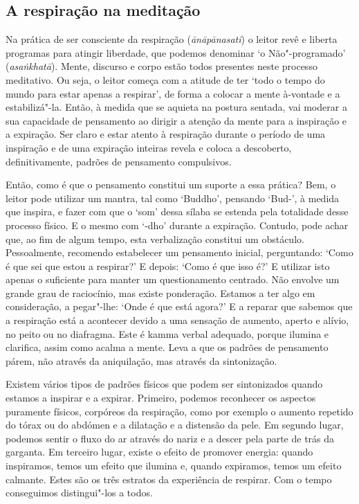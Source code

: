 \subsection{A respiração na meditação}

Na prática de ser consciente da respiração (\emph{ānāpānasati}) o leitor revê e
liberta programas para atingir liberdade, que podemos denominar `o
Não"-programado' (\emph{asaṅkhatā}). Mente, discurso e corpo estão todos
presentes neste processo meditativo. Ou seja, o leitor começa com a atitude de
ter `todo o tempo do mundo para estar apenas a respirar', de forma a colocar a
mente à-vontade e a estabilizá"-la. Então, à medida que se aquieta na postura
sentada, vai moderar a sua capacidade de pensamento ao dirigir a atenção da
mente para a inspiração e a expiração. Ser claro e estar atento à respiração
durante o período de uma inspiração e de uma expiração inteiras revela e coloca
a descoberto, definitivamente, padrões de pensamento compulsivos.

Então, como é que o pensamento constitui um suporte a essa prática? Bem, o
leitor pode utilizar um mantra, tal como `Buddho', pensando `Bud-', à medida que
inspira, e fazer com que o `som' dessa sílaba se estenda pela totalidade desse
processo físico. E o mesmo com `-dho' durante a expiração. Contudo, pode achar
que, ao fim de algum tempo, esta verbalização constitui um obstáculo.
Pessoalmente, recomendo estabelecer um pensamento inicial, perguntando: `Como é
que sei que estou a respirar?' E depois: `Como é que isso é?' E utilizar isto
apenas o suficiente para manter um questionamento centrado. Não envolve um
grande grau de raciocínio, mas existe ponderação. Estamos a ter algo em
consideração, a pegar"-lhe: `Onde é que está agora?' E a reparar que sabemos que
a respiração está a acontecer devido a uma sensação de aumento, aperto e alívio,
no peito ou no diafragma. Este é kamma verbal adequado, porque ilumina e
clarifica, assim como acalma a mente. Leva a que os padrões de pensamento párem,
não através da aniquilação, mas através da sintonização.

Existem vários tipos de padrões físicos que podem ser sintonizados quando
estamos a inspirar e a expirar. Primeiro, podemos reconhecer os aspectos
puramente físicos, corpóreos da respiração, como por exemplo o aumento repetido
do tórax ou do abdómen e a dilatação e a distensão da pele. Em segundo lugar,
podemos sentir o fluxo do ar através do nariz e a descer pela parte de trás da
garganta. Em terceiro lugar, existe o efeito de promover energia: quando
inspiramos, temos um efeito que ilumina e, quando expiramos, temos um efeito
calmante. Estes são os três estratos da experiência de respirar. Com o tempo
conseguimos distingui"-los a todos.

